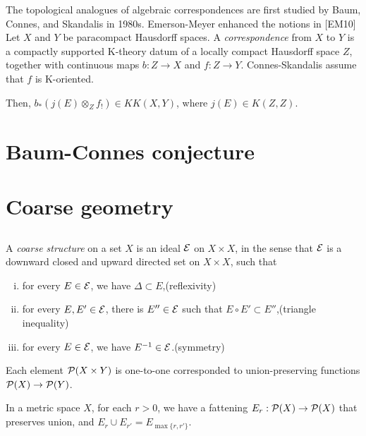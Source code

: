\documentclass{../../large}
\begin{document}
The topological analogues of algebraic correspondences are first studied by Baum, Connes, and Skandalis in 1980s.
Emerson-Meyer enhanced the notions in [EM10]
Let $X$ and $Y$ be paracompact Hausdorff spaces.
A \emph{correspondence} from $X$ to $Y$ is a compactly supported K-theory datum of a locally compact Hausdorff space $Z$, together with continuous maps $b:Z\to X$ and $f:Z\to Y$.
Connes-Skandalis assume that $f$ is K-oriented.



Then, $b_*(j(E)\otimes_Zf_!)\in KK(X,Y)$, where $j(E)\in K(Z,Z)$.








\chapter{Baum-Connes conjecture}









\chapter{Coarse geometry}


\section{}

A \emph{coarse structure} on a set $X$ is an ideal $\mathcal{E}$ on $X\times X$, in the sense that $\mathcal{E}$ is a downward closed and upward directed set on $X\times X$, such that
\begin{enumerate}[(i)]
\item for every $E\in\mathcal{E}$, we have $\Delta\subset E$,\hfill(reflexivity)
\item for every $E,E'\in\mathcal{E}$, there is $E''\in\mathcal{E}$ such that $E\circ E'\subset E''$,\hfill(triangle inequality)
\item for every $E\in\mathcal{E}$, we have $E^{-1}\in\mathcal{E}$.\hfill(symmetry)
\end{enumerate}

Each element $\mathcal{P}(X\times Y)$ is one-to-one corresponded to union-preserving functions $\mathcal{P}(X)\to\mathcal{P}(Y)$.

In a metric space $X$, for each $r>0$, we have a fattening $E_r:\mathcal{P}(X)\to\mathcal{P}(X)$ that preserves union, and $E_r\cup E_{r'}=E_{\max\{r,r'\}}$.
\end{document}
